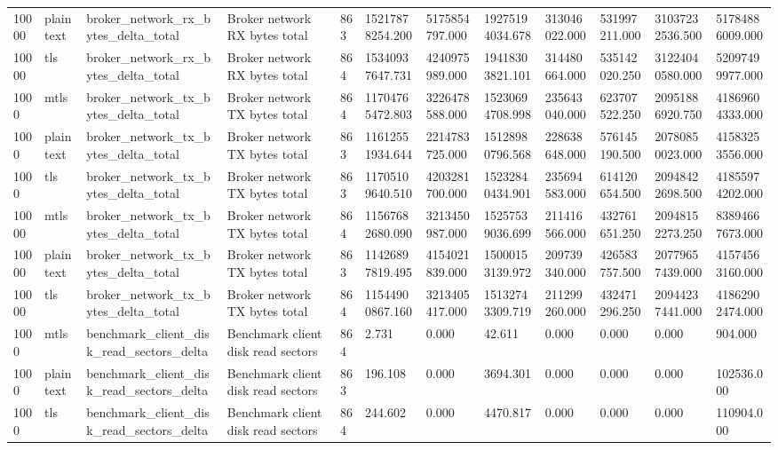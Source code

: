 \begin{longtable}{llllllllllll}
10000 & plaintext & broker\_network\_rx\_bytes\_delta\_total & Broker network RX bytes total & 863 & 15217878254.200 & 5175854797.000 & 19275194034.678 & 313046022.000 & 531997211.000 & 31037232536.500 & 51784886009.000 \\
10000 & tls & broker\_network\_rx\_bytes\_delta\_total & Broker network RX bytes total & 864 & 15340937647.731 & 4240975989.000 & 19418303821.101 & 314480664.000 & 535142020.250 & 31224040580.000 & 52097499977.000 \\
1000 & mtls & broker\_network\_tx\_bytes\_delta\_total & Broker network TX bytes total & 864 & 11704765472.803 & 3226478588.000 & 15230694708.998 & 235643040.000 & 623707522.250 & 20951886920.750 & 41869604333.000 \\
1000 & plaintext & broker\_network\_tx\_bytes\_delta\_total & Broker network TX bytes total & 863 & 11612551934.644 & 2214783725.000 & 15128980796.568 & 228638648.000 & 576145190.500 & 20780850023.000 & 41583253556.000 \\
1000 & tls & broker\_network\_tx\_bytes\_delta\_total & Broker network TX bytes total & 863 & 11705109640.510 & 4203281700.000 & 15232840434.901 & 235694583.000 & 614120654.500 & 20948422698.500 & 41855974202.000 \\
10000 & mtls & broker\_network\_tx\_bytes\_delta\_total & Broker network TX bytes total & 864 & 11567682680.090 & 3213450987.000 & 15257539036.699 & 211416566.000 & 432761651.250 & 20948152273.250 & 83894667673.000 \\
10000 & plaintext & broker\_network\_tx\_bytes\_delta\_total & Broker network TX bytes total & 863 & 11426897819.495 & 4154021839.000 & 15000153139.972 & 209739340.000 & 426583757.500 & 20779657439.000 & 41574563160.000 \\
10000 & tls & broker\_network\_tx\_bytes\_delta\_total & Broker network TX bytes total & 864 & 11544900867.160 & 3213405417.000 & 15132743309.719 & 211299260.000 & 432471296.250 & 20944237441.000 & 41862902474.000 \\
1000 & mtls & benchmark\_client\_disk\_read\_sectors\_delta & Benchmark client disk read sectors & 864 & 2.731 & 0.000 & 42.611 & 0.000 & 0.000 & 0.000 & 904.000 \\
1000 & plaintext & benchmark\_client\_disk\_read\_sectors\_delta & Benchmark client disk read sectors & 863 & 196.108 & 0.000 & 3694.301 & 0.000 & 0.000 & 0.000 & 102536.000 \\
1000 & tls & benchmark\_client\_disk\_read\_sectors\_delta & Benchmark client disk read sectors & 864 & 244.602 & 0.000 & 4470.817 & 0.000 & 0.000 & 0.000 & 110904.000 \\

\end{longtable}
